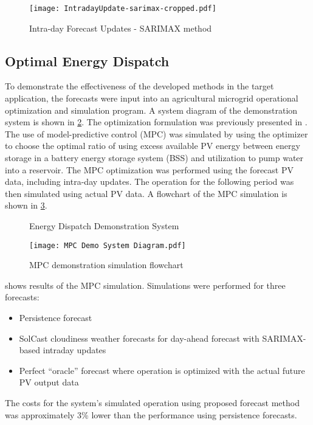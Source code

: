\begin{figure}[tbh]
	\centering
	\texttt{[image: IntradayUpdate-sarimax-cropped.pdf]}
	\caption{Intra-day Forecast Updates - SARIMAX method}
	\label{fig:intraday-forecast}
\end{figure}


\subsection{Optimal Energy Dispatch}

To demonstrate the effectiveness of the developed methods in the target application,
the forecasts were input into an agricultural microgrid operational optimization and simulation program.
A system diagram of the demonstration system is shown in \cref{fig:demo-system}.
The optimization formulation was previously presented in \cite{Brown2022}.
The use of model-predictive control (MPC) was simulated by using the optimizer to choose the optimal ratio of using excess available PV energy between energy storage in a battery energy storage system (BSS) and utilization to pump water into a reservoir.
The MPC optimization was performed using the forecast PV data, including intra-day updates.
The operation for the following period was then simulated using actual PV data.
A flowchart of the MPC simulation is shown in \cref{fig:mpc-simulation-flowchart}.

\begin{figure}[t]
	\centering
	\fontsize{6.7pt}{9pt}\selectfont
	\def\svgwidth{0.8\columnwidth}
	
	\caption{Energy Dispatch Demonstration System}
	\label{fig:demo-system}
\end{figure}

\begin{figure}[tbh]
	\centering
	\texttt{[image: MPC Demo System Diagram.pdf]}
	\caption{MPC demonstration simulation flowchart}
	\label{fig:mpc-simulation-flowchart}
\end{figure}

 shows results of the MPC simulation. Simulations were performed for three forecasts:
\begin{itemize}
\item Persistence forecast
\item SolCast cloudiness weather forecasts for day-ahead forecast with SARIMAX-based intraday updates
\item Perfect ``oracle'' forecast where operation is optimized with the actual future PV output data
\end{itemize}
The costs for the system's simulated operation using proposed forecast method was approximately
3\% lower than the performance using persistence forecasts.

